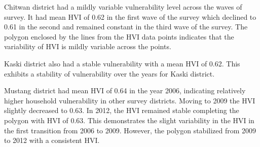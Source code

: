 \documentclass[12pt, a4paper]{article}
\begin{document}
Chitwan district had a mildly variable vulnerability level across the waves of survey. It had mean HVI of 0.62 in the first wave of the survey which declined to 0.61 in the second and remained constant in the third wave of the survey. The polygon enclosed by the lines from the HVI data points indicates that the variability of HVI is mildly variable across the points. 

Kaski district also had a stable vulnerability with a mean HVI of 0.62. This exhibits a stability of vulnerability over the years for Kaski district. 

Mustang district had mean HVI of 0.64 in the year 2006, indicating relatively higher household vulnerability in other survey districts. Moving to 2009 the HVI slightly decreased to 0.63. In 2012, the HVI remained stable completing the polygon with HVI of 0.63. This demonstrates the slight variability in the HVI in the first transition from 2006 to 2009. However, the polygon stabilized from 2009 to 2012 with a consistent HVI. 
\end{document}

